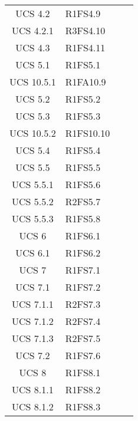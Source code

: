 {\begin{longtable}{ c C{4cm} c c}
UCS 4.2 & R1FS4.9\\


UCS 4.2.1 & R3FS4.10\\

UCS 4.3 & R1FS4.11\\

UCS 5.1 & R1FS5.1\\

UCS 10.5.1 & R1FA10.9\\

UCS 5.2 & R1FS5.2\\

UCS 5.3 & R1FS5.3\\

UCS 10.5.2 & R1FS10.10\\

UCS 5.4 & R1FS5.4\\

UCS 5.5 & R1FS5.5\\


UCS 5.5.1 & R1FS5.6\\

UCS 5.5.2 & R2FS5.7\\

UCS 5.5.3 & R1FS5.8\\

UCS 6 & R1FS6.1\\

UCS 6.1 & R1FS6.2\\

UCS 7 & R1FS7.1\\

UCS 7.1 & R1FS7.2\\

UCS 7.1.1 & R2FS7.3\\

UCS 7.1.2 & R2FS7.4\\

UCS 7.1.3 & R2FS7.5\\

UCS 7.2 & R1FS7.6\\

UCS 8 & R1FS8.1\\


UCS 8.1.1 & R1FS8.2\\

UCS 8.1.2 & R1FS8.3\\


\end{longtable}}
